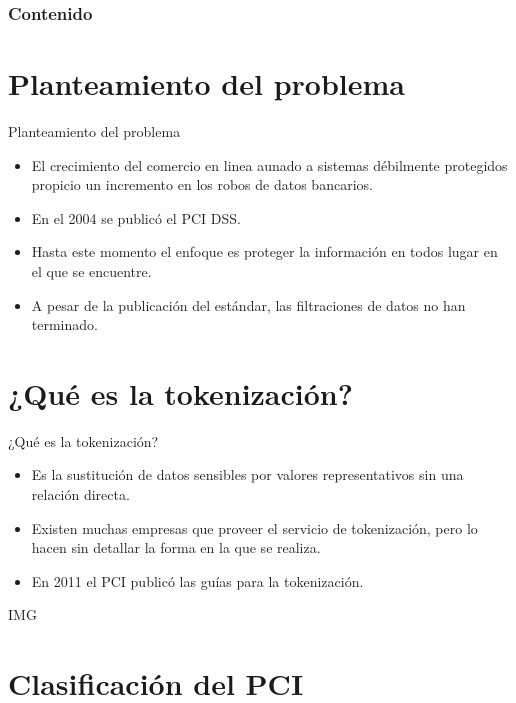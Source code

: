 \documentclass{beamer}
\begin{document}
  {
  \frame{\titlepage}}

  \begin{frame}
    \frametitle{Contenido}
    \setcounter{tocdepth}{1}
    \tableofcontents[pausesections]
  \end{frame}

  \setlength{\parskip}{0.5em}

  \section{Planteamiento del problema}

  \begin{frame}{Planteamiento del problema}
    \begin{itemize}
      \item El crecimiento del comercio en linea aunado a sistemas débilmente protegidos propicio un incremento en los robos de datos bancarios.
      \item En el 2004 se publicó el PCI DSS.
      \item Hasta este momento el enfoque es proteger la información en todos lugar en el que se encuentre.
      \item A pesar de la publicación del estándar, las filtraciones de datos no han terminado.
    \end{itemize}
  \end{frame}

  \section{¿Qué es la tokenización?}

  \begin{frame}{¿Qué es la tokenización?}
    \begin{itemize}
      \item Es la sustitución de datos sensibles por valores representativos sin una relación directa.
      \item Existen muchas empresas que proveer el servicio de tokenización, pero lo hacen sin detallar la forma en la que se realiza.
      \item En 2011 el PCI publicó las guías para la tokenización.
    \end{itemize}
    IMG
  \end{frame}

  \section{Clasificación del PCI}
\end{document}
